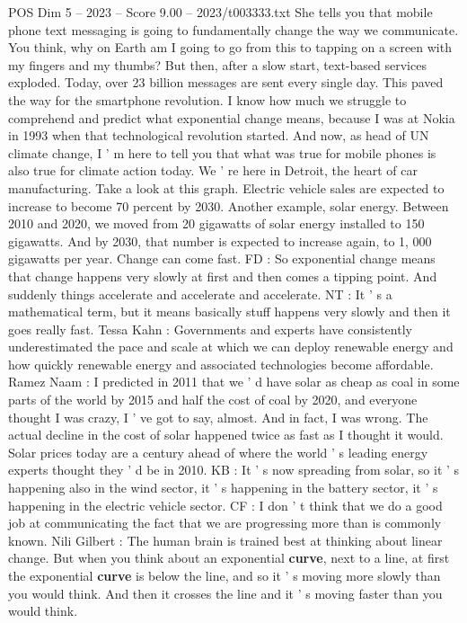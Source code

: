\begin{textsample}{POS Dim 5 – 2023 – Score 9.00 – 2023/t003333.txt}
She tells you that mobile phone text messaging is going to fundamentally change the way we communicate.
You think, why on Earth am I going to go from this to tapping on a screen with my fingers and my thumbs?
But then, after a slow start, text-based services exploded.
Today, over 23 billion messages are sent every single day.
This paved the way for the smartphone revolution.
I know how much we struggle to comprehend and predict what exponential change means, because I was at Nokia in 1993 when that technological revolution started.
And now, as head of UN climate change, I ' m here to tell you that what was true for mobile phones is also true for climate action today.
We ' re here in Detroit, the heart of car manufacturing.
Take a look at this graph.
Electric vehicle sales are expected to increase to become 70 percent by 2030.
Another example, solar energy.
Between 2010 and 2020, we moved from 20 gigawatts of solar energy installed to 150 gigawatts.
And by 2030, that number is expected to increase again, to 1, 000 gigawatts per year.
Change can come fast.
FD : So exponential change means that change happens very slowly at first and then comes a tipping point.
And suddenly things accelerate and accelerate and accelerate.
NT : It ' s a mathematical term, but it means basically stuff happens very slowly and then it goes really fast.
Tessa Kahn : Governments and experts have consistently underestimated the pace and scale at which we can deploy renewable energy and how quickly renewable energy and associated technologies become affordable.
Ramez Naam : I predicted in 2011 that we ' d have solar as cheap as coal in some parts of the world by 2015 and half the cost of coal by 2020, and everyone thought I was crazy, I ' ve got to say, almost.
And in fact, I was wrong.
The actual decline in the cost of solar happened twice as fast as I thought it would.
Solar prices today are a century ahead of where the world ' s leading energy experts thought they ' d be in 2010.
KB : It ' s now spreading from solar, so it ' s happening also in the wind sector, it ' s happening in the battery sector, it ' s happening in the electric vehicle sector.
CF : I don ' t think that we do a good job at communicating the fact that we are progressing more than is commonly known.
Nili Gilbert : The human brain is trained best at thinking about linear change.
But when you think about an exponential \textbf{curve}, next to a line, at first the exponential \textbf{curve} is below the line, and so it ' s moving more slowly than you would think.
And then it crosses the line and it ' s moving faster than you would think.

\end{textsample}
